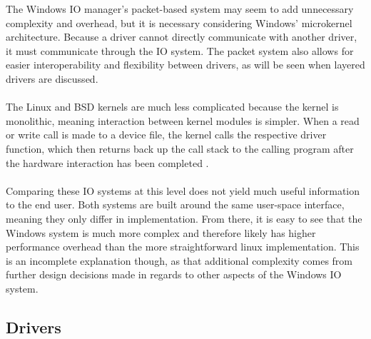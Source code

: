 \documentclass[10pt,draftclsnofoot,onecolumn]{article}
\begin{document}
\noindent The Windows IO manager’s packet-based system may seem to add unnecessary complexity and overhead, but it is necessary considering Windows’ microkernel architecture. Because a driver cannot directly communicate with another driver, it must communicate through the IO system. The packet system also allows for easier interoperability and flexibility between drivers, as will be seen when layered drivers are discussed. 
\\\\
The Linux and BSD kernels are much less complicated because the kernel is monolithic, meaning interaction between kernel modules is simpler. When a read or write call is made to a device file, the kernel calls the respective driver function, which then returns back up the call stack to the calling program after the hardware interaction has been completed \cite{BSDM,Loonix}. 
\\\\
Comparing these IO systems at this level does not yield much useful information to the end user. Both systems are built around the same user-space interface, meaning they only differ in implementation. From there, it is easy to see that the Windows system is much more complex and therefore likely has higher performance overhead than the more straightforward linux implementation. This is an incomplete explanation though, as that additional complexity comes from further design decisions made in regards to other aspects of the Windows IO system.

\subsection{Drivers}
\end{document}
